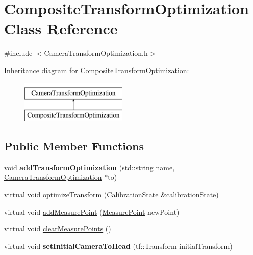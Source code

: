 \hypertarget{classCompositeTransformOptimization}{\section{\-Composite\-Transform\-Optimization \-Class \-Reference}
\label{classCompositeTransformOptimization}
}


{\ttfamily \#include $<$\-Camera\-Transform\-Optimization.\-h$>$}

\-Inheritance diagram for \-Composite\-Transform\-Optimization\-:\begin{figure}[H]
\begin{center}
\leavevmode
\includegraphics[height=2.000000cm]{classCompositeTransformOptimization}
\end{center}
\end{figure}
\subsection*{\-Public \-Member \-Functions}
\begin{DoxyCompactItemize}
\item 
\hypertarget{classCompositeTransformOptimization_a3a0ba4201758b8917059faf41f7f106b}{void {\bfseries add\-Transform\-Optimization} (std\-::string name, \hyperlink{classCameraTransformOptimization}{\-Camera\-Transform\-Optimization} $\ast$to)}\label{classCompositeTransformOptimization_a3a0ba4201758b8917059faf41f7f106b}

\item 
virtual void \hyperlink{classCompositeTransformOptimization_aa77358fb8292c767bfbf029115ced9cf}{optimize\-Transform} (\hyperlink{classCalibrationState}{\-Calibration\-State} \&calibration\-State)
\item 
virtual void \hyperlink{classCompositeTransformOptimization_aff2a0c0afce22998d1a1128b1671d99c}{add\-Measure\-Point} (\hyperlink{classCameraMeasurePoint}{\-Measure\-Point} new\-Point)
\item 
virtual void \hyperlink{classCompositeTransformOptimization_a5313f4fff02e5d48a7007af68ea6f008}{clear\-Measure\-Points} ()
\item 
\hypertarget{classCompositeTransformOptimization_ae6ba2a0afb45a340fb1919fe92e70156}{virtual void {\bfseries set\-Initial\-Camera\-To\-Head} (tf\-::\-Transform initial\-Transform)}\label{classCompositeTransformOptimization_ae6ba2a0afb45a340fb1919fe92e70156}

\end{DoxyCompactItemize}


